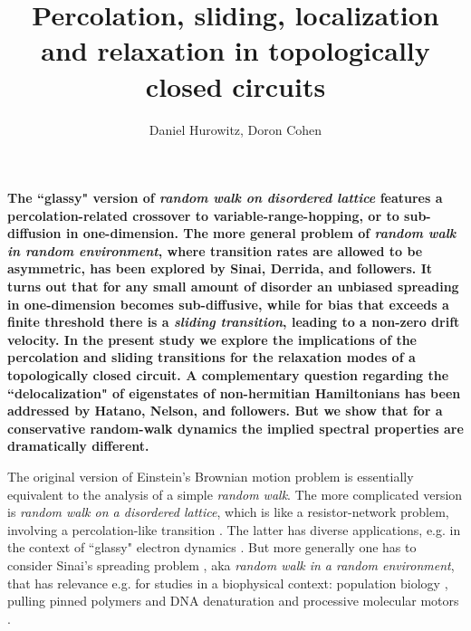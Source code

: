 \documentclass[aps,pre,floats,floatfix,twocolumn]{revtex4}
\begin{document}
 
\title{Percolation, sliding, localization and relaxation in topologically closed circuits}

\author{Daniel Hurowitz, Doron Cohen}



\maketitle

{\bf
The ``glassy" version of {\em random walk on disordered lattice}  
features a percolation-related crossover to variable-range-hopping,
or to sub-diffusion in one-dimension.  
The more general problem of {\em random walk in random environment}, 
where transition rates are allowed to be asymmetric, 
has been explored by Sinai, Derrida, and followers.  
It turns out that for any small amount of disorder 
an unbiased spreading in one-dimension becomes sub-diffusive,  
while for bias that exceeds a finite threshold there 
is a {\em sliding transition}, leading to a non-zero drift velocity.
%
In the present study we explore the implications of the percolation and sliding transitions 
for the relaxation modes of a topologically closed circuit. 
A complementary question regarding  the ``delocalization" of eigenstates 
of non-hermitian Hamiltonians has been addressed by Hatano, Nelson, and followers. 
But we show that for a conservative random-walk dynamics 
the implied spectral properties are dramatically different.
}


The original version of Einstein's Brownian motion problem
is essentially equivalent to the analysis of a simple {\em random walk}. 
The more complicated version is {\em random walk on a disordered lattice},  
which is like a resistor-network problem, 
involving a percolation-like transition \cite{Alexander}.  
The latter has diverse applications, e.g. 
in the context of ``glassy" electron dynamics \cite{ege,egt}. 
%
But more generally one has to consider Sinai's spreading problem \cite{Sinai,odh1,odh3,BouchaudReview}, 
aka {\em random walk in a random environment}, 
that has relevance e.g. for studies in a biophysical context: 
population biology \cite{popbio,popbio2}, pulling pinned polymers and DNA denaturation \cite{DNA1,DNA2} 
and processive molecular motors \cite{fisher1999force,rief2000myosin}.
\end{document}
